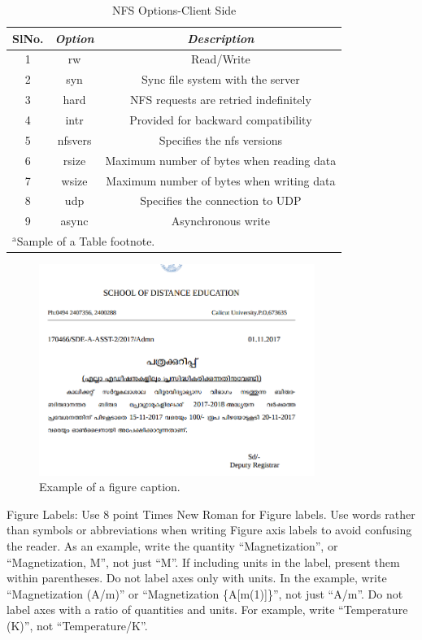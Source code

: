 \documentclass[conference]{IEEEtran}
\begin{document}
\begin{table}[htbp]
\caption{NFS Options-Client Side}
\begin{center}
\begin{tabular}{|c|c|c|}
\hline
\cline{2-3} 
\textbf{SlNo.} & \textbf{\textit{Option}}& \textbf{\textit{Description}} \\
\hline
1& rw & Read/Write  \\
2& syn & Sync file system with the server  \\
3& hard & NFS requests are retried indefinitely  \\
4& intr & Provided for backward compatibility \\
5& nfsvers & Specifies the nfs versions  \\
6& rsize & Maximum number of bytes when reading data  \\
7& wsize & Maximum number of bytes when writing data  \\
8& udp & Specifies the connection to UDP  \\
9& async & Asynchronous write  \\
\hline
\multicolumn{3}{l}{$^{\mathrm{a}}$Sample of a Table footnote.}
\end{tabular}
\label{tab1}
\end{center}
\end{table}

\begin{figure}[htbp]
\centerline{\includegraphics[width=0.8\textwidth,natwidth=610,natheight=642]{fig1.png}}
\caption{Example of a figure caption.}
\label{fig}
\end{figure}

Figure Labels: Use 8 point Times New Roman for Figure labels. Use words 
rather than symbols or abbreviations when writing Figure axis labels to 
avoid confusing the reader. As an example, write the quantity 
``Magnetization'', or ``Magnetization, M'', not just ``M''. If including 
units in the label, present them within parentheses. Do not label axes only 
with units. In the example, write ``Magnetization (A/m)'' or ``Magnetization 
\{A[m(1)]\}'', not just ``A/m''. Do not label axes with a ratio of 
quantities and units. For example, write ``Temperature (K)'', not 
``Temperature/K''.
\end{document}

